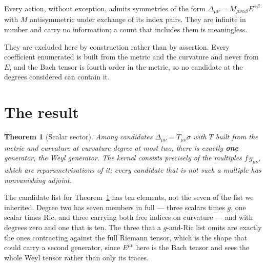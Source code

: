 \documentclass[11pt]{article}
\newtheorem{theorem}{Theorem}[section]
\theoremstyle{definition}
\theoremstyle{remark}
\begin{document}
Every action, without exception, admits symmetries of the form
\(\Delta_{\mu\nu}=M_{\mu\nu\alpha\beta}E^{\alpha\beta}\) with \(M\)
antisymmetric under exchange of its index pairs.  They are infinite in number
and carry no information; a count that includes them is meaningless.

They are excluded here by construction rather than by assertion.  Every
coefficient enumerated is built from the metric and the curvature and never
from \(E\), and the Bach tensor is fourth order in the metric, so no candidate
at the degrees considered can contain it.

\section{The result}
\label{sec:result}

\begin{theorem}[Scalar sector]
\label{thm:scalar}
Among candidates \(\Delta_{\mu\nu}=T_{\mu\nu}\sigma\) with \(T\) built from the
metric and curvature at curvature degree at most two, there is exactly
\textbf{one} generator, the Weyl generator.  The kernel consists precisely of
the multiples \(f\,g_{\mu\nu}\), which are reparametrisations of it; every
candidate that is not such a multiple has nonvanishing adjoint.
\end{theorem}

The candidate list for Theorem~\ref{thm:scalar} has ten elements, not the seven
of the list we inherited.  Degree two has seven members in full --- three
scalars times \(g\), one scalar times \(\mathrm{Ric}\), and three carrying both
free indices on curvature --- and with degrees zero and one that is ten.  The
three that a \(g\)-and-\(\mathrm{Ric}\) list omits are exactly the ones
contracting against the full Riemann tensor, which is the shape that could
carry a second generator, since \(E^{\mu\nu}\) here is the Bach tensor and sees
the whole Weyl tensor rather than only its traces.
\end{document}
